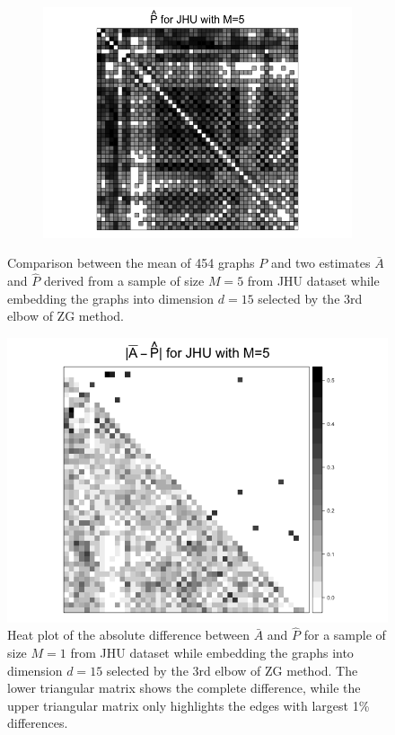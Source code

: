 \documentclass[a4paper]{article}
\begin{document}
\begin{figure}
\begin{subfigure}{.33\textwidth}
  \includegraphics[width=1.2\linewidth]{Phat_JHU_m5.png}
\end{subfigure}
\caption{Comparison between the mean of 454 graphs $P$ and two estimates $\bar{A}$ and $\hat{P}$ derived from a sample of size $M=5$ from JHU dataset while embedding the graphs into dimension $d=15$ selected by the 3rd elbow of ZG method.}
\label{fig:adj_JHU_m5}
\end{figure}

\begin{figure}[!htb]
\centering
\includegraphics[width=1\textwidth]{Diff_JHU_m5.png}
\caption{Heat plot of the absolute difference between $\bar{A}$ and $\hat{P}$ for a sample of size $M=1$ from JHU dataset while embedding the graphs into dimension $d=15$ selected by the 3rd elbow of ZG method. The lower triangular matrix shows the complete difference, while the upper triangular matrix only highlights the edges with largest 1\% differences.}
\label{fig:Diff_JHU_m5}
\end{figure}
\end{document}
